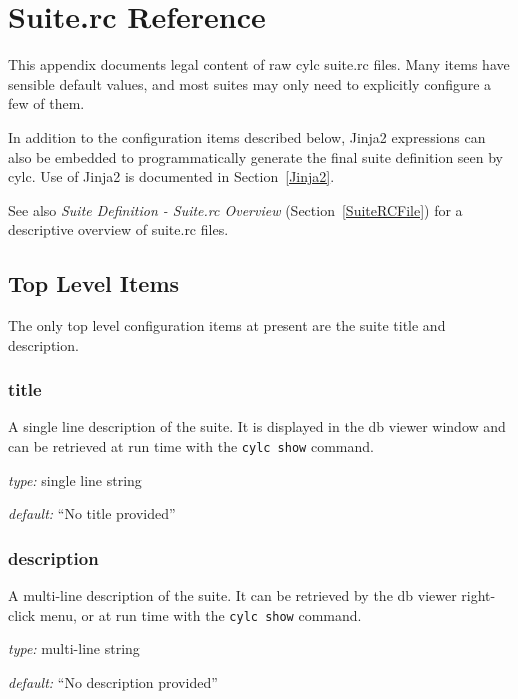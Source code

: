 \section{Suite.rc Reference}
\label{SuiteRCReference}

\lstset{language=bash}

This appendix documents legal content of raw cylc suite.rc files.
Many items have sensible default values, and most suites may only need to
explicitly configure a few of them.

In addition to the configuration items described below, Jinja2 expressions can
also be embedded to programmatically generate the final suite definition seen
by cylc.  Use of Jinja2 is documented in Section~\ref{Jinja2}.

See also {\em Suite Definition - Suite.rc Overview}
(Section~\ref{SuiteRCFile}) for a descriptive overview of suite.rc
files.

\subsection{Top Level Items}

The only top level configuration items at present are the suite title
and description.

\subsubsection{title}

A single line description of the suite. It is displayed in the db viewer 
window and can be retrieved at run time with the
\lstinline=cylc show= command.

\begin{myitemize}
\item {\em type:} single line string
\item {\em default:} ``No title provided''
\end{myitemize}

\subsubsection{description}

A multi-line description of the suite. It can be retrieved by the db viewer 
right-click menu, or at run time with the \lstinline=cylc show= command.

\begin{myitemize}
\item {\em type:} multi-line string
\item {\em default:} ``No description provided''
\end{myitemize}

